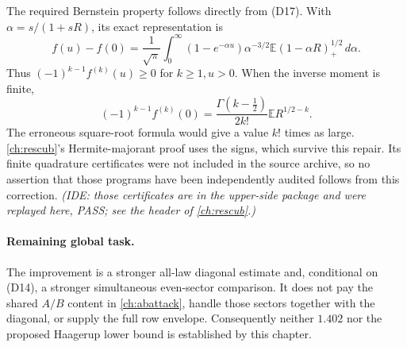 The required Bernstein property follows directly from (D17).
With $\alpha=s/(1+sR)$, its exact representation is
\[
 f(u)-f(0)=\frac1{\sqrt\pi}\int_0^\infty
 (1-e^{-\alpha u})\alpha^{-3/2}
       \mathbb E(1-\alpha R)_+^{1/2}\,d\alpha.
 \tag{D18}
\]
Thus $(-1)^{k-1}f^{(k)}(u)\ge0$ for $k\ge1,u>0$.
When the inverse moment is finite,
\[
 (-1)^{k-1}f^{(k)}(0)
 =\frac{\Gamma(k-\tfrac12)}{2k!}\mathbb E R^{1/2-k}.
 \tag{D19}
\]
The erroneous square-root formula would give a value $k!$ times as
large. \autoref{ch:rescub}'s Hermite-majorant proof uses the signs, which survive
this repair. Its finite quadrature certificates were not included in the
source archive, so no assertion that those programs have been independently
audited follows from this correction. \emph{(IDE: those certificates are in the
upper-side package and were replayed here, PASS; see the header of \autoref{ch:rescub}.)}

\paragraph{Remaining global task.}
The improvement is a stronger all-law diagonal estimate and, conditional on
(D14), a stronger simultaneous even-sector comparison. It does not pay the
shared $A/B$ content in \autoref{ch:abattack}, handle those sectors
together with the diagonal, or supply the full row envelope.
Consequently neither $1.402$ nor the proposed Haagerup lower bound is
established by this chapter.


